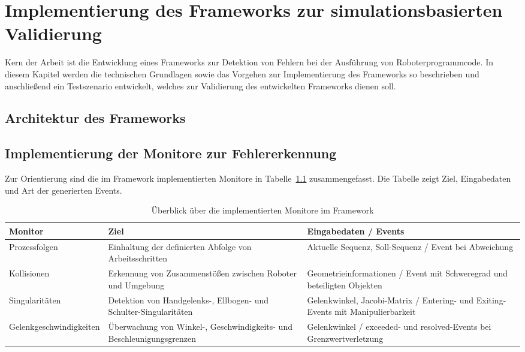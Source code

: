 \chapter{Implementierung des Frameworks zur simulationsbasierten
Validierung}
\label{sec:framework}
Kern der Arbeit ist die Entwicklung eines Frameworks zur Detektion von Fehlern
bei der Ausführung von Roboterprogrammcode. In diesem Kapitel werden
die technischen Grundlagen sowie das Vorgehen zur
Implementierung des Frameworks so beschrieben und anschließend ein Testszenario
entwickelt, welches zur Validierung des entwickelten Frameworks dienen soll.

\section{Architektur des Frameworks}
\label{sec:architektur_frameowork}


\section{Implementierung der Monitore zur Fehlererkennung}
\label{sec:implementierungMonitore}

Zur Orientierung sind die im Framework implementierten Monitore in
Tabelle~\ref{tab:monitor_overview_arch} zusammengefasst. Die Tabelle zeigt Ziel,
Eingabedaten und Art der generierten Events.

\begin{table}[H]
  \centering
  \small
  \begin{tabularx}{\textwidth}{lXX}
    \toprule
    \textbf{Monitor}        & \textbf{Ziel}
    & \textbf{Eingabedaten / Events} \\
    \midrule
    Prozessfolgen           & Einhaltung der definierten Abfolge von
    Arbeitsschritten               &
    Aktuelle Sequenz, Soll-Sequenz / Event bei Abweichung
    \\
    \addlinespace
    Kollisionen             & Erkennung von Zusammenstößen zwischen
    Roboter und Umgebung            &
    Geometrieinformationen / Event mit Schweregrad und beteiligten
    Objekten                                                          \\
    \addlinespace
    Singularitäten          & Detektion von \mbox{Handgelenks-,} Ellbogen- und
    Schulter-Singularitäten              &
    Gelenkwinkel, Jacobi-Matrix / Entering- und Exiting-Events mit
    Manipulierbarkeit                                                      \\
    \addlinespace
    Gelenkgeschwindigkeiten & Überwachung von Winkel-,
    Geschwindigkeits- und Beschleunigungsgrenzen &
    Gelenkwinkel / exceeded- und resolved-Events bei
    Grenzwertverletzung
    \\
    \bottomrule
  \end{tabularx}
  \caption{Überblick über die implementierten Monitore im Framework}
  \label{tab:monitor_overview_arch}
\end{table}

